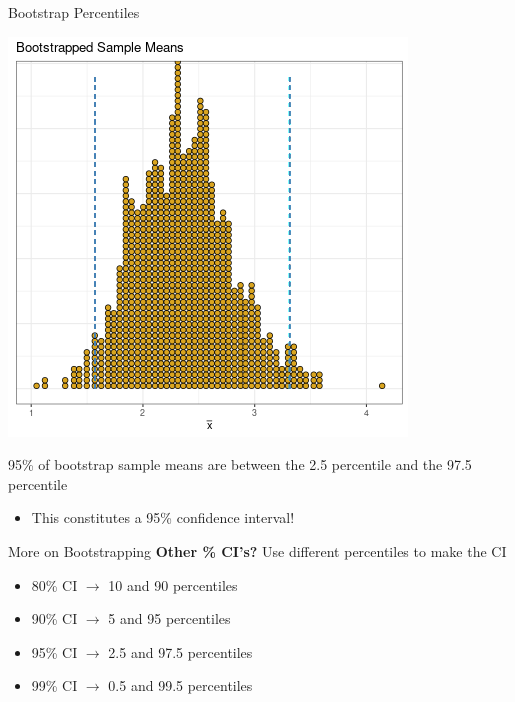 \documentclass{beamer}
\begin{document}
\begin{frame}{Bootstrap Percentiles}
\begin{center}
\includegraphics[scale=0.42]{img/mean_bootstrap_perc.png}
\end{center}
95\% of bootstrap sample means are between the 2.5 percentile and the 97.5 percentile
\begin{itemize}
    \item This constitutes a 95\% confidence interval!
\end{itemize}
\end{frame}

\begin{frame}{More on Bootstrapping}
\textbf{Other \% CI's?} Use different percentiles to make the CI
\begin{itemize}
    \item 80\% CI $\rightarrow$ 10 and 90 percentiles
    \item 90\% CI $\rightarrow$ 5 and 95 percentiles
    \item 95\% CI $\rightarrow$ 2.5 and 97.5 percentiles
    \item 99\% CI $\rightarrow$ 0.5 and 99.5 percentiles
\end{itemize}
\end{frame}
\end{document}
